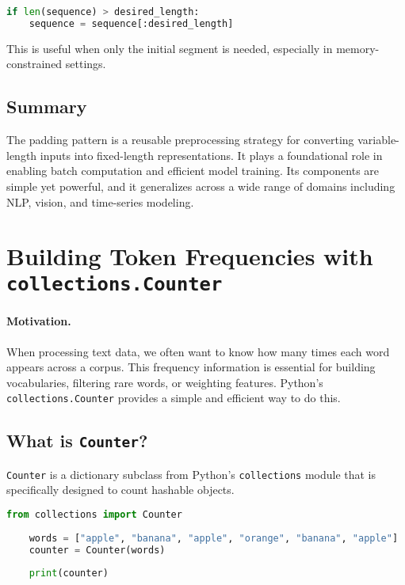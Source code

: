 \begin{lstlisting}[language=Python, caption={Truncating a sequence to desired length}]
	if len(sequence) > desired_length:
	sequence = sequence[:desired_length]
\end{lstlisting}

This is useful when only the initial segment is needed, especially in memory-constrained settings.

\subsection*{Summary}

The padding pattern is a reusable preprocessing strategy for converting variable-length inputs into fixed-length representations. It plays a foundational role in enabling batch computation and efficient model training. Its components are simple yet powerful, and it generalizes across a wide range of domains including NLP, vision, and time-series modeling.

\section{Building Token Frequencies with \texttt{collections.Counter}}

\paragraph{Motivation.}
When processing text data, we often want to know how many times each word appears across a corpus. This frequency information is essential for building vocabularies, filtering rare words, or weighting features. Python’s \texttt{collections.Counter} provides a simple and efficient way to do this.

\subsection{What is \texttt{Counter}?}

\texttt{Counter} is a dictionary subclass from Python's \texttt{collections} module that is specifically designed to count hashable objects.

\begin{lstlisting}[language=Python, caption={Basic Counter example}]
	from collections import Counter
	
	words = ["apple", "banana", "apple", "orange", "banana", "apple"]
	counter = Counter(words)
	
	print(counter)
\end{lstlisting}

